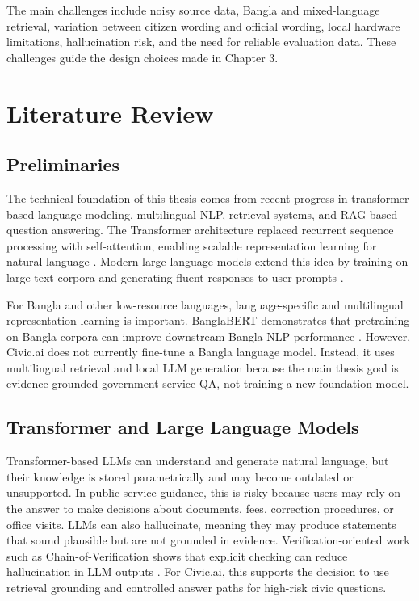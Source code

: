 \documentclass[12pt,oneside,openany]{report}
\begin{document}
The main challenges include noisy source data, Bangla and mixed-language retrieval, variation between citizen wording and official wording, local hardware limitations, hallucination risk, and the need for reliable evaluation data. These challenges guide the design choices made in Chapter 3.

\chapter{Literature Review}
\section{Preliminaries}
The technical foundation of this thesis comes from recent progress in transformer-based language modeling, multilingual NLP, retrieval systems, and RAG-based question answering. The Transformer architecture replaced recurrent sequence processing with self-attention, enabling scalable representation learning for natural language \cite{vaswani2017attention}. Modern large language models extend this idea by training on large text corpora and generating fluent responses to user prompts \cite{touvron2023llama,dubey2024llama3}.

For Bangla and other low-resource languages, language-specific and multilingual representation learning is important. BanglaBERT demonstrates that pretraining on Bangla corpora can improve downstream Bangla NLP performance \cite{bhattacharjee2021banglabert}. However, Civic.ai does not currently fine-tune a Bangla language model. Instead, it uses multilingual retrieval and local LLM generation because the main thesis goal is evidence-grounded government-service QA, not training a new foundation model.

\section{Transformer and Large Language Models}
Transformer-based LLMs can understand and generate natural language, but their knowledge is stored parametrically and may become outdated or unsupported. In public-service guidance, this is risky because users may rely on the answer to make decisions about documents, fees, correction procedures, or office visits. LLMs can also hallucinate, meaning they may produce statements that sound plausible but are not grounded in evidence. Verification-oriented work such as Chain-of-Verification shows that explicit checking can reduce hallucination in LLM outputs \cite{dhuliawala2023chain}. For Civic.ai, this supports the decision to use retrieval grounding and controlled answer paths for high-risk civic questions.
\end{document}

